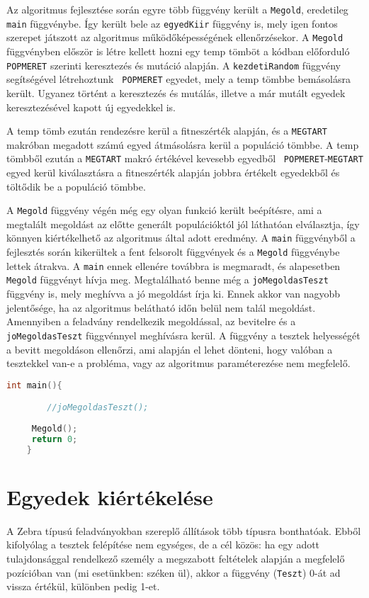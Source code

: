 \documentclass[12pt,a4paper,oneside]{report}
\begin{document}
	Az algoritmus fejlesztése során egyre több függvény került a \texttt{Megold}, eredetileg \texttt{main} függvénybe. Így került bele az \texttt{egyedKiir} függvény is, mely igen fontos szerepet játszott az algoritmus működőképességének ellenőrzésekor.
A \texttt{Megold} függvényben először is létre kellett hozni egy temp tömböt a kódban előforduló \texttt{ POPMERET} szerinti keresztezés és mutáció alapján. A \texttt{kezdetiRandom} függvény segítségével létrehoztunk \texttt{ POPMERET} egyedet, mely a temp tömbbe bemásolásra került. 		Ugyanez történt a keresztezés és mutálás, illetve a már mutált egyedek keresztezésével kapott új egyedekkel is. 
	
A temp tömb ezután rendezésre kerül a fitneszérték alapján, és a \texttt{MEGTART}  makróban megadott számú egyed átmásolásra kerül a populáció tömbbe. A temp tömbből ezután a \texttt{MEGTART} makró értékével kevesebb egyedből \texttt{ POPMERET}-\texttt{MEGTART}  egyed kerül kiválasztásra a fitneszérték alapján jobbra értékelt egyedekből és töltődik be a populáció tömbbe.

A \texttt{Megold} függvény végén még egy olyan funkció került beépítésre, ami a megtalált megoldást az előtte generált populációktól jól láthatóan elválasztja, így könnyen kiértékelhető az algoritmus által adott eredmény.
A  \texttt{main} függvényből a fejlesztés során kikerültek a fent felsorolt függvények és a \texttt{Megold} függvénybe lettek átrakva.  A  \texttt{main} ennek ellenére továbbra is megmaradt, és alapesetben \texttt{Megold} függvényt hívja meg. Megtalálható benne még a \texttt{joMegoldasTeszt} függvény is, mely meghívva a jó megoldást írja ki. Ennek akkor van nagyobb jelentősége, ha az algoritmus belátható időn belül nem talál megoldást. Amennyiben a feladvány rendelkezik megoldással, az bevitelre és a \texttt{joMegoldasTeszt} függvénnyel meghívásra kerül. A függvény a tesztek helyességét a bevitt megoldáson ellenőrzi, ami alapján el lehet dönteni, hogy valóban a tesztekkel van-e a probléma, vagy az algoritmus paraméterezése nem megfelelő.

\begin{lstlisting}[frame=single, language=C]
	int main(){

    	//joMegoldasTeszt();
    
   	 Megold();
  	 return 0;
	}

	\end{lstlisting}


    \section{Egyedek kiértékelése} %
	A Zebra típusú feladványokban szereplő állítások több típusra bonthatóak.
	Ebből kifolyólag a tesztek felépítése nem egységes, de a cél közös: ha egy adott tulajdonsággal rendelkező személy a megszabott feltételek alapján a megfelelő pozícióban van (mi esetünkben: széken ül), akkor a függvény (\texttt{Teszt}) 0-át ad vissza értékül, különben pedig 1-et.
	
\end{document}
